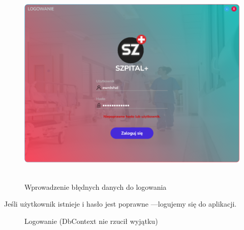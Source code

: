 \begin{figure}[H]
\begin{center}
    \includegraphics[height=10cm]{images/niep_uzyt.png}
    \caption{Wprowadzenie błędnych danych do logowania}
\end{center}
\end{figure}

Jeśli użytkownik istnieje i hasło jest poprawne —logujemy się do aplikacji.

\begin{figure}[H]
    \centering
    \caption{Logowanie (DbContext nie rzucił wyjątku)}
\end{figure}

